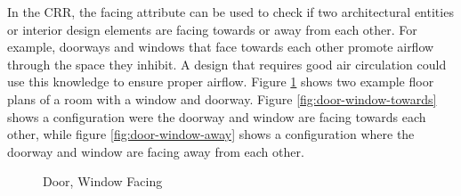 \documentclass[12pt]{ucthesis}
\begin{document}
In the CRR, the facing attribute can be used to check if two architectural entities or interior design elements are facing towards or away from each other. For example, doorways and windows that face towards each other promote airflow through the space they inhibit. A design that requires good air circulation could use this knowledge to ensure proper airflow. Figure \ref{door-window-facing} shows two example floor plans of a room with a window and doorway. Figure \ref{fig:door-window-towards} shows a configuration were the doorway and window are facing towards each other, while figure \ref{fig:door-window-away} shows a configuration where the doorway and window are facing away from each other. 

\begin{figure}[H]
 \centering
  \hspace{10 mm}
 \caption{Door, Window Facing}
\label{door-window-facing}
\end{figure}

\end{document}
